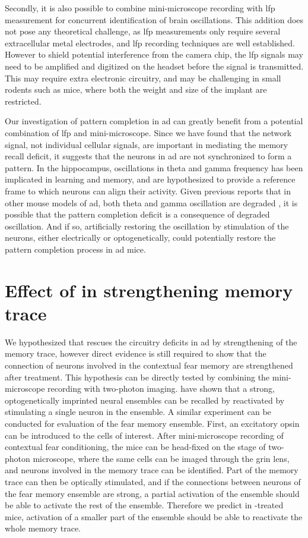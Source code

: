 Secondly, it is also possible to combine mini-microscope recording with \gls{lfp} measurement for concurrent identification of brain oscillations. This addition does not pose any theoretical challenge, as \gls{lfp} measurements only require several extracellular metal electrodes, and \gls{lfp} recording techniques are well established. However to shield potential interference from the camera chip, the \gls{lfp} signals may need to be amplified and digitized on the headset before the signal is transmitted. This may require extra electronic circuitry, and may be challenging in small rodents such as mice, where both the weight and size of the implant are restricted. 

Our investigation of pattern completion in \gls{ad} can greatly benefit from a potential combination of \gls{lfp} and mini-microscope. Since we have found that the network signal, not individual cellular signals, are important in mediating the memory recall deficit, it suggests that the neurons in \gls{ad} are not synchronized to form a pattern. In the hippocampus, oscillations in theta and gamma frequency has been implicated in learning and memory, and are hypothesized to provide a reference frame to which neurons can align their activity. Given previous reports that in other mouse models of \gls{ad}, both theta and gamma oscillation are degraded \citep{driver07, villette10, scott12, goutagny13}, it is possible that the pattern completion deficit is a consequence of degraded oscillation. And if so, artificially restoring the oscillation by stimulation of the neurons, either electrically or optogenetically, could potentially restore the pattern completion process in \gls{ad} mice. 


\section{Effect of \tglu{} in strengthening memory trace}

We hypothesized that \tglu{} rescues the circuitry deficits in \gls{ad} by strengthening of the memory trace, however direct evidence is still required to show that the connection of neurons involved in the contextual fear memory are strengthened after \tglu{} treatment. This hypothesis can be directly tested by combining the mini-microscope recording with two-photon imaging. \citet{carrillo-reid16} have shown that a strong, optogenetically imprinted neural ensembles can be recalled by reactivated by stimulating a single neuron in the ensemble. A similar experiment can be conducted for evaluation of the fear memory ensemble. First, an excitatory opsin can be introduced to the cells of interest. After mini-microscope recording of contextual fear conditioning, the mice can be head-fixed on the stage of two-photon microscope, where the same cells can be imaged through the \gls{grin} lens, and neurons involved in the memory trace can be identified. Part of the memory trace can then be optically stimulated, and if the connections between neurons of the fear memory ensemble are strong, a partial activation of the ensemble should be able to activate the rest of the ensemble. Therefore we predict in \tglu{}-treated mice, activation of a smaller part of the ensemble should be able to reactivate the whole memory trace. 

